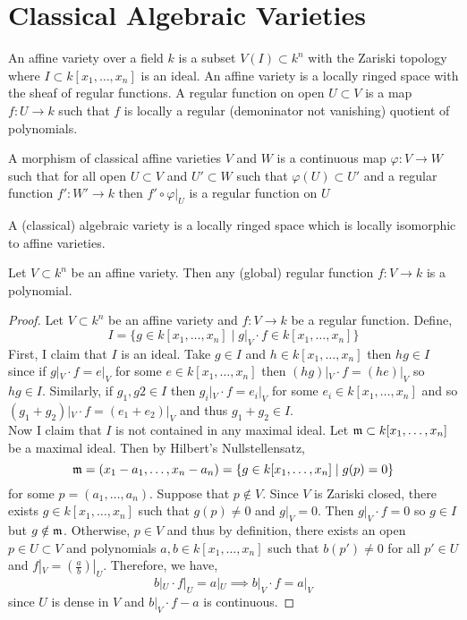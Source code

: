 \documentclass[12pt]{article}
\begin{document}
\section{Classical Algebraic Varieties}

\begin{definition}
An affine variety over a field $k$ is a subset $V(I) \subset k^n$ with the Zariski topology where $I \subset k[x_1, \dots, x_n]$ is an ideal. An affine variety is a locally ringed space with the sheaf of regular functions. A regular function on open $U \subset V$ is a map $f : U \to k$ such that $f$ is locally a regular (demoninator not vanishing) quotient of polynomials. 
\end{definition}

\begin{definition}
A morphism of classical affine varieties $V$ and $W$ is a continuous map $\varphi : V \to W$ such that for all open $U \subset V$ and $U' \subset W$ such that $\varphi(U) \subset U'$ and a regular function $f' : W' \to k$ then $f' \circ \varphi|_{U}$ is a regular function on $U$
\end{definition}

\begin{definition} 
A (classical) algebraic variety is a locally ringed space which is locally isomorphic to affine varieties.  
\end{definition}

\begin{lemma}
Let $V \subset k^n$ be an affine variety. Then any (global) regular function $f : V \to k$ is a polynomial.
\end{lemma}

\begin{proof}
Let $V \subset k^n$ be an affine variety and $f : V \to k$ be a regular function. Define,
\[ I = \{ g \in k[x_1, \dots, x_n] \mid g|_V \cdot f \in k[x_1, \dots, x_n] \} \]
First, I claim that $I$ is an ideal. Take $g \in I$ and $h \in k[x_1, \dots, x_n]$ then $hg \in I$ since if $g|_V \cdot f = e|_V$ for some $e \in k[x_1, \dots, x_n]$ then $(hg)|_V \cdot f = (h e)|_V$ so $hg \in I$. Similarly, if $g_1, g2 \in I$ then $g_i|_V \cdot f = e_i |_V$ for some $e_i \in k[x_1, \dots, x_n]$ and so $(g_1 + g_2)|_V \cdot f = (e_1 + e_2)|_V$ and thus $g_1 + g_2 \in I$. \bigskip\\
Now I claim that $I$ is not contained in any maximal ideal. Let $\mathfrak{m} \subset k[x_1, \dots, x_n]$ be a maximal ideal. Then by Hilbert's Nullstellensatz, 
\[ \mathfrak{m} = (x_1 - a_1, \dots, x_n - a_n) = \{g \in k[x_1, \dots, x_n] \mid g(p) = 0\} \]
for some $p = (a_1, \dots, a_n)$. Suppose that $p \notin V$. Since $V$ is Zariski closed, there exists $g \in k[x_1, \dots, x_n]$ such that $g(p) \neq 0$ and $g|_V = 0$. Then $g|_V \cdot f = 0$ so $g \in I$ but $g \notin \mathfrak{m}$. Otherwise, $p \in V$ and thus by definition, there exists an open $p \in U \subset V$ and polynomials $a,b \in k[x_1, \dots, x_n]$ such that $b(p') \neq 0$ for all $p' \in U$ and $f|_V = \left( \frac{a}{b} \right)|_U$. Therefore, we have,
\[ b|_U \cdot f|_U = a|_U \implies b|_V \cdot f = a|_V \]
since $U$ is dense in $V$ and $b|_V \cdot f - a$ is continuous. 
\end{proof}
\end{document}
